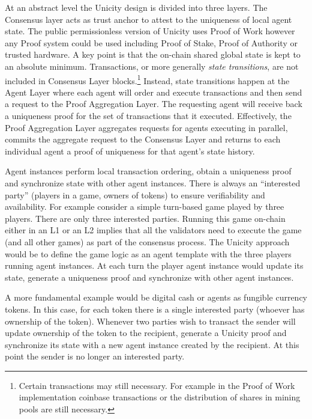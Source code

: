\documentclass{article}
\begin{document}
At an abstract level the Unicity design is divided into three layers. The Consensus layer acts as trust anchor to attest to the uniqueness of local agent state. The public permissionless version of Unicity uses Proof of Work however any Proof system could be used including Proof of Stake, Proof of Authority or trusted hardware. A key point is that the on-chain shared global state is kept to an absolute minimum. Transactions, or more generally \textit{state transitions}, are not included in Consensus Layer blocks.\footnote{Certain transactions may still necessary. For example in the Proof of Work implementation coinbase transactions or the distribution of shares in mining pools are still necessary.}
	Instead, state transitions happen at the Agent Layer where each agent will order and execute transactions and then send a request to the Proof Aggregation Layer. The requesting agent will receive back a uniqueness proof for the set of transactions that it executed. Effectively, the Proof Aggregation Layer aggregates requests for agents executing in parallel,  commits the aggregate request to the Consensus Layer and returns to each individual agent a proof of uniqueness for that agent's state history.


Agent instances perform local transaction ordering, obtain a uniqueness proof and synchronize state with other agent instances. There is always an ``interested party'' (players in a game, owners of tokens) to ensure verifiability and availability. For example consider a simple turn-based game played by three players. There are only three interested parties. Running this game on-chain either in an L1 or an L2 implies that all the validators  need to execute the game (and all other games) as part of the consensus process. The Unicity approach would be to define the game logic as an agent template with the three players running agent instances. At each turn the player agent instance would update its state, generate a uniqueness proof and synchronize with other agent instances.



 A more fundamental example would be digital cash or agents as fungible currency tokens. In this case, for each token there is a single interested party (whoever has ownership of the token). Whenever two parties wish to transact the sender will update ownership of the token to the recipient, generate a Unicity proof and synchronize its state with a new agent instance created by the recipient. At this point the sender is no longer an interested party.
\end{document}
